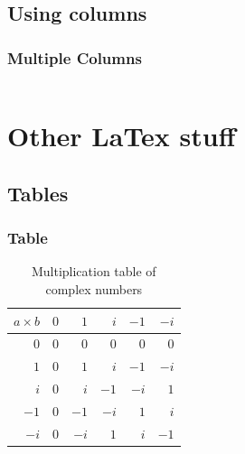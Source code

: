 \documentclass[aspectratio=169]{beamer}
\begin{document}
\subsection{Using columns}


\begin{frame}
\frametitle{Multiple Columns}
\begin{columns}[c] 



\end{columns}
\end{frame}



\section{Other LaTex stuff}

\subsection{Tables}


\begin{frame}
\frametitle{Table}
\begin{table}[H] 
\begin{tabular}{r | r r r r r} 
$a \times b$ & $0$ &  $1$ &  $i$ & $-1$ & $-i$ \\ \hline
         $0$ & $0$ &  $0$ &  $0$ &  $0$ &  $0$ \\
         $1$ & $0$ &  $1$ &  $i$ & $-1$ & $-i$ \\
         $i$ & $0$ &  $i$ & $-1$ & $-i$ &  $1$ \\
        $-1$ & $0$ & $-1$ & $-i$ &  $1$ &  $i$ \\
        $-i$ & $0$ & $-i$ &  $1$ &  $i$ & $-1$ \\
\end{tabular}
\caption{Multiplication table of complex numbers}
\end{table}
\end{frame}
\end{document}
